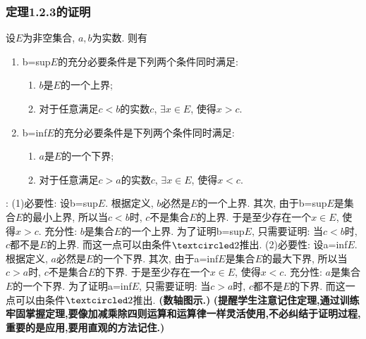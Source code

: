 \documentclass[12pt,UTF8]{ctexart}
\begin{document}
\subsubsection{定理1.2.3的证明}
  设$E$为非空集合, $a,b$为实数. 则有
\indent
\begin{enumerate}
\item[(1)]b=sup$E$的充分必要条件是下列两个条件同时满足:
	\begin{enumerate}
		\item[\textcircled{1}]$b$是$E$的一个上界;
		\item[\textcircled{2}]对于任意满足$c<b$的实数$c$, $\exists x\in E$, 使得$x>c$.
	\end{enumerate}
\item[(2)]b=inf$E$的充分必要条件是下列两个条件同时满足:
	\begin{enumerate}
		\item[\textcircled{1}]$a$是$E$的一个下界;
		\item[\textcircled{2}]对于任意满足$c>a$的实数$c$, $\exists x\in E$, 使得$x<c$.
	\end{enumerate}
\end{enumerate}
{:}
(1)必要性: 设b=sup$E$. 根据定义, $b$必然是$E$的一个上界. 其次, 由于b=sup$E$是集合$E$的最小上界, 所以当$c<b$时, $c$不是集合$E$的上界. 于是至少存在一个$x\in E$, 使得$x>c$.
\newline
充分性: $b$是集合$E$的一个上界. 为了证明b=sup$E$, 只需要证明: 当$c<b$时, $c$都不是$E$的上界. 而这一点可以由条件$\textcircled2$推出.
\newline
(2)必要性: 设a=inf$E$. 根据定义, $a$必然是$E$的一个下界. 其次, 由于a=inf$E$是集合$E$的最大下界, 所以当$c>a$时, $c$不是集合$E$的下界. 于是至少存在一个$x\in E$, 使得$x<c$.
\newline
充分性: $a$是集合$E$的一个下界. 为了证明a=inf$E$, 只需要证明: 当$c>a$时, $c$都不是$E$的下界. 而这一点可以由条件$\textcircled2$推出.
\newline
{\bf(数轴图示.)}
\newline
{\bf(提醒学生注意记住定理,通过训练牢固掌握定理,要像加减乘除四则运算和运算律一样灵活使用,不必纠结于证明过程,重要的是应用,要用直观的方法记住.)}\footnotemark[1]
\end{document}
